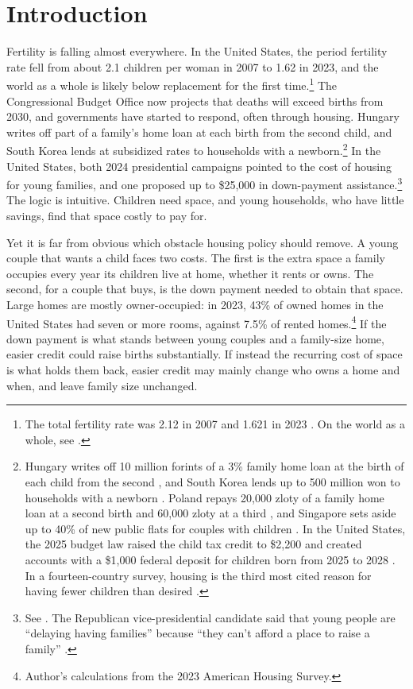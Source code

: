 \section{Introduction}
\label{sec:introduction}


Fertility is falling almost everywhere. In the United States, the period
fertility rate fell from about 2.1 children per woman in 2007 to 1.62 in
2023, and the world as a whole is likely below replacement for the first
time.\footnote{The total fertility rate was 2.12 in 2007
\citep{cboDemographicOutlook2026} and 1.621 in 2023
\citep{ostermanBirthsFinal2023}. On the world as a whole, see
\citet{fernandezVillaverdeNorrickTerraIncognita2026}.} The Congressional
Budget Office now projects that deaths will exceed births from 2030, and
governments have started to respond, often through housing. Hungary writes
off part of a family's home loan at each birth from the second child, and
South Korea lends at subsidized rates to households with a
newborn.\footnote{Hungary writes off 10 million forints of a 3\% family home
loan at the birth of each child from the second \citep{hungaryCSOKPlus}, and
South Korea lends up to 500 million won to households with a newborn
\citep{koreaNewbornLoan}. Poland repays 20,000 zloty of a family home loan at
a second birth and 60,000 zloty at a third \citep{polandFamilyRepayment}, and
Singapore sets aside up to 40\% of new public flats for couples with children
\citep{singaporeFPPS}. In the United States, the 2025 budget law raised the
child tax credit to \$2,200 and created accounts with a \$1,000 federal
deposit for children born from 2025 to 2028 \citep{publicLaw119-21}. In a
fourteen-country survey, housing is the third most cited reason for having
fewer children than desired \citep{unfpaSWP2025}.} In the United States, both
2024 presidential campaigns pointed to the cost of housing for young
families, and one proposed up to \$25,000 in down-payment
assistance.\footnote{See \citet{harrisCampaign2024}. The Republican
vice-presidential candidate said that young people are ``delaying having
families'' because ``they can't afford a place to raise a family''
\citep{vanceNewsNation2024}.} The logic is intuitive. Children need space,
and young households, who have little savings, find that space costly to pay
for.

Yet it is far from obvious which obstacle housing policy should remove. A
young couple that wants a child faces two costs. The first is the extra
space a family occupies every year its children live at home, whether it
rents or owns. The second, for a couple that buys, is the down payment needed
to obtain that space. Large homes are mostly owner-occupied: in 2023, 43\% of
owned homes in the United States had seven or more rooms, against 7.5\% of
rented homes.\footnote{Author's calculations from the 2023 American Housing
Survey.} If the down payment is what stands between young couples and a
family-size home, easier credit could raise births substantially. If instead
the recurring cost of space is what holds them back, easier credit may mainly
change who owns a home and when, and leave family size unchanged.

